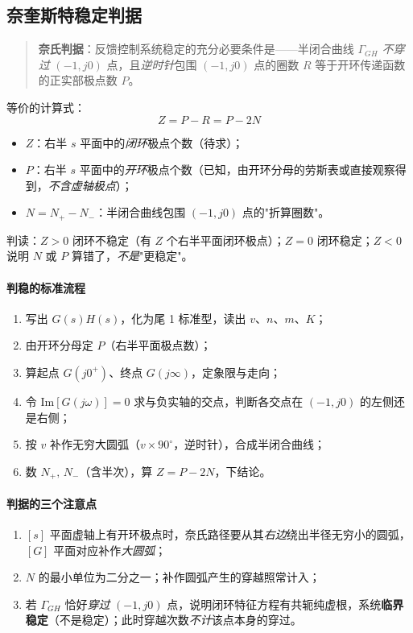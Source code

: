 \subsection{奈奎斯特稳定判据}
\begin{quote}
\textbf{奈氏判据}：反馈控制系统稳定的充分必要条件是——半闭合曲线 $\Gamma_{GH}$ \emph{不穿过} $(-1,j0)$ 点，且\emph{逆时针}包围 $(-1,j0)$ 点的圈数 $R$ 等于开环传递函数的正实部极点数 $P$。
\end{quote}
等价的计算式：
\[
\boxed{\,Z=P-R=P-2N\,}
\]
\begin{itemize}
    \item $Z$：右半 $s$ 平面中的\emph{闭环}极点个数（待求）；
    \item $P$：右半 $s$ 平面中的\emph{开环}极点个数（已知，由开环分母的劳斯表或直接观察得到，\emph{不含虚轴极点}）；
    \item $N=N_+-N_-$：半闭合曲线包围 $(-1,j0)$ 点的"折算圈数"。
\end{itemize}
判读：$Z>0$ 闭环不稳定（有 $Z$ 个右半平面闭环极点）；$Z=0$ 闭环稳定；$Z<0$ 说明 $N$ 或 $P$ 算错了，\emph{不是}"更稳定"。

\paragraph{判稳的标准流程}
\begin{enumerate}
    \item 写出 $G(s)H(s)$，化为尾 1 标准型，读出 $v$、$n$、$m$、$K$；
    \item 由开环分母定 $P$（右半平面极点数）；
    \item 算起点 $G(j0^+)$、终点 $G(j\infty)$，定象限与走向；
    \item 令 $\mathrm{Im}[G(j\omega)]=0$ 求与负实轴的交点，判断各交点在 $(-1,j0)$ 的左侧还是右侧；
    \item 按 $v$ 补作无穷大圆弧（$v\times90^\circ$，逆时针），合成半闭合曲线；
    \item 数 $N_+,\,N_-$（含半次），算 $Z=P-2N$，下结论。
\end{enumerate}

\paragraph{判据的三个注意点}
\begin{enumerate}
    \item $[s]$ 平面虚轴上有开环极点时，奈氏路径要从其\emph{右边}绕出半径无穷小的圆弧，$[G]$ 平面对应补作\emph{大圆弧}；
    \item $N$ 的最小单位为二分之一；补作圆弧产生的穿越照常计入；
    \item 若 $\Gamma_{GH}$ 恰好\emph{穿过} $(-1,j0)$ 点，说明闭环特征方程有共轭纯虚根，系统\textbf{临界稳定}（不是稳定）；此时穿越次数\emph{不计}该点本身的穿过。
\end{enumerate}

